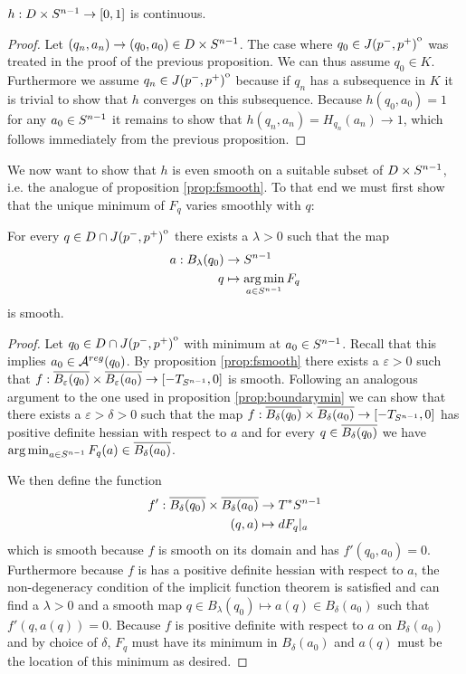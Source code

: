 \begin{corollary}
    $h:D\times {S^{n-1}}\to [0,1]$ is continuous.
\end{corollary}
\begin{proof}
    Let $(q_n,a_n)\to (q_0,a_0)\in D\times {S^{n-1}}$. The case where $q_0\in {\kern0ptJ(p^-,p^+)}^{\mathrm{o}}$ was treated in the proof of the previous proposition. We can thus assume $q_0\in K$. Furthermore we assume $q_n \in {\kern0ptJ(p^-,p^+)}^{\mathrm{o}}$ because if $q_n$ has a subsequence in $K$ it is trivial to show that $h$ converges on this subsequence. Because $h(q_0,a_0)=1$ for any $a_0\in {S^{n-1}}$ it remains to show that $h(q_n,a_n)=H_{q_n}(a_n)\to 1$, which follows immediately from the previous proposition.
\end{proof}

We now want to show that $h$ is even smooth on a suitable subset of $D\times {S^{n-1}}$, i.e. the analogue of proposition \ref{prop:fsmooth}. To that end we must first show that the unique minimum of $F_q$ varies smoothly with $q$:
\begin{lemma}\label{lem:minsmooth}
    For every $q\in D\cap {\kern0ptJ(p^-,p^+)}^{\mathrm{o}}$ there exists a $\lambda>0$ such that the map 
    \begin{align*}
        a:B_\lambda(q_0)&\to {S^{n-1}}\\
        q&\mapsto \operatorname*{arg\,min}_{a\in {S^{n-1}}} F_q
    \end{align*} is smooth.
\end{lemma}
\begin{proof}
    Let $q_0\in D\cap {\kern0ptJ(p^-,p^+)}^{\mathrm{o}}$ with minimum at $a_0\in {S^{n-1}}$. Recall that this implies $a_0\in {{\mathcal{A}}^{reg}}(q_0)$.
    By proposition \ref{prop:fsmooth} there exists a $\varepsilon>0$ such that $f:{\overline{B_\varepsilon(q_0)}}\times{\overline{B_\varepsilon(a_0)}}\to [-T_{S^{n-1}},0]$ is smooth. Following an analogous argument to the one used in proposition \ref{prop:boundarymin} we can show that there exists a $\varepsilon>\delta>0$ such that the map $f:{\overline{B_\delta(q_0)}}\times{\overline{B_\delta(a_0)}}\to [-T_{S^{n-1}},0]$ has positive definite hessian with respect to $a$ and for every $q\in {\overline{B_\delta(q_0)}}$ we have $\operatorname*{arg\,min}_{a\in {S^{n-1}}} F_{q}(a) \in {\overline{B_\delta(a_0)}}$. 

    We then define the function 
    \begin{align*}
        f':{\overline{B_\delta(q_0)}}\times{\overline{B_\delta(a_0)}}&\to T^*{S^{n-1}}\\
        (q,a)&\mapsto dF_q\rvert_a
    \end{align*} which is smooth because $f$ is smooth on its domain and has $f'(q_0,a_0)=0$. Furthermore because $f$ is has a positive definite hessian with respect to $a$, the non-degeneracy condition of the implicit function theorem is satisfied and can find a $\lambda>0$ and a smooth map $q\in B_\lambda(q_0)\mapsto a(q)\in B_\delta(a_0)$ such that $f'(q,a(q))=0$. Because $f$ is positive definite with respect to $a$ on $B_\delta(a_0)$ and by choice of $\delta$, $F_q$ must have its minimum in $B_\delta(a_0)$ and $a(q)$ must be the location of this minimum as desired.
\end{proof}



